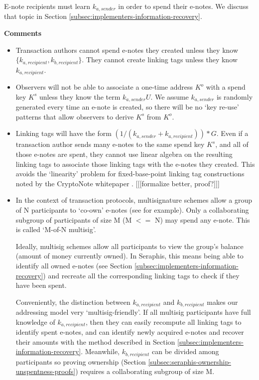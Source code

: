 E-note recipients must learn $k_{a, sender}$ in order to spend their e-notes. We discuss that topic in Section \ref{subsec:implementers-information-recovery}.

\textbf{Comments}

\begin{itemize}
    \item Transaction authors cannot spend e-notes they created unless they know $\{k_{a, recipient}, k_{b, recipient}\}$. They cannot create linking tags unless they know $k_{a, recipient}$.

    \item Observers will not be able to associate a one-time address $K^o$ with a spend key $K^s$ unless they know the term $k_{a,sender} U$. We assume $k_{a,sender}$ is randomly generated every time an e-note is created, so there will be no `key re-use' patterns that allow observers to derive $K^s$ from $K^o$.

    \item Linking tags will have the form $(1/(k_{a, sender} + k_{a, recipient}))*G$. Even if a transaction author sends many e-notes to the same spend key $K^s$, and all of those e-notes are spent, they cannot use linear algebra on the resulting linking tags to associate those linking tags with the e-notes they created. This avoids the `linearity' problem for fixed-base-point linking tag constructions noted by the CryptoNote whitepaper \cite{cryptoNoteWhitePaper}. [[[formalize better, proof?]]]

    \item In the context of transaction protocols, multisignature schemes allow a group of N participants to `co-own' e-notes (see \cite{MRL-0009-multisig} for example). Only a collaborating subgroup of participants of size M (M $<=$ N) may spend any e-note. This is called `M-of-N multisig'.

    Ideally, multisig schemes allow all participants to view the group's balance (amount of money currently owned). In Seraphis, this means being able to identify all owned e-notes (see Section \ref{subsec:implementers-information-recovery}) and recreate all the corresponding linking tags to check if they have been spent.

    Conveniently, the distinction between $k_{a, recipient}$ and $k_{b, recipient}$ makes our addressing model very `multisig-friendly'. If all multisig participants have full knowledge of $k_{a, recipient}$, then they can easily recompute all linking tags to identify spent e-notes, and can identify newly acquired e-notes and recover their amounts with the method described in Section \ref{subsec:implementers-information-recovery}. Meanwhile, $k_{b, recipient}$ can be divided among participants so proving ownership (Section \ref{subsec:seraphis-ownership-unspentness-proofs}) requires a collaborating subgroup of size M.


\end{itemize}

